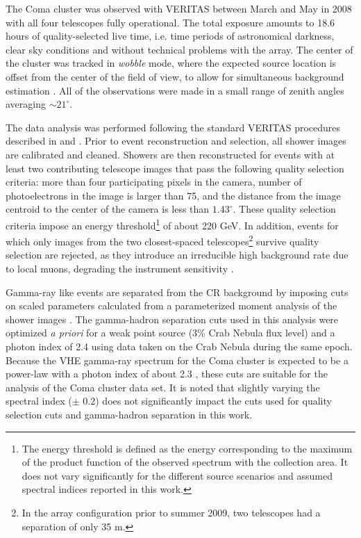 \documentclass[12pt,manuscript]{aastex}
\begin{document}
The Coma cluster was observed with VERITAS between March and May in 2008 with all four telescopes
fully operational. The total exposure amounts to 18.6 hours of quality-selected live time, i.e.
time periods of astronomical darkness, clear sky conditions and without technical problems with the
array. The center of the cluster was tracked in \emph{wobble} mode, where the expected source
location is offset from the center of the field of view, to allow for simultaneous background
estimation \citep{article:Fomin_etal:1994}. All of the observations were made in a small range of
zenith angles averaging $\sim 21^{\circ}$.

The data analysis was performed following the standard VERITAS procedures described in
\citet{inproc:Cogan_etal:2007} and \citet{inproc:Daniel_etal:2007}. Prior to event reconstruction
and selection, all shower images are calibrated and cleaned. Showers are then reconstructed for
events with at least two contributing telescope images that pass the following quality selection
criteria: more than four participating pixels in the camera, number of photoelectrons in the image
is larger than 75, and the distance from the image centroid to the center of the camera is less
than $1.43^{\circ}$. These quality selection criteria impose an energy threshold\footnote{The energy
threshold is defined as the energy corresponding to the maximum of the product function of the
observed spectrum with the collection area. It does not vary significantly for the different source
scenarios and assumed spectral indices reported in this work.} of about 220 GeV. In addition,
events for which only images from the two closest-spaced telescopes\footnote{In the array
configuration prior to summer 2009, two telescopes  had a separation of only 35 m.} survive quality
selection are rejected, as they introduce an irreducible high background rate due to local muons, 
degrading the instrument sensitivity \citep{article:MaierKnapp:2007}.

Gamma-ray like events are separated from the CR background by imposing cuts on scaled parameters
\citep{article:Aharonian_etal:1997, article:Krawczynski_etal:2006} calculated from a parameterized
moment analysis of the shower images \citep{inproc:Hillas:1985}. The gamma-hadron separation cuts
used in this analysis were optimized {\em a priori} for a weak point source (3\% Crab Nebula flux
level) and a photon index of 2.4 using data taken on the Crab Nebula during the same epoch. Because
the VHE gamma-ray spectrum for the Coma cluster is expected to be a power-law with a photon index of
about 2.3 \citep{article:PinzkePfrommer:2010}, these cuts are suitable for the analysis of the Coma
cluster data set. It is noted that slightly varying the spectral index ($\pm$ 0.2) does not
significantly impact the cuts used for quality selection cuts and gamma-hadron separation in this
work. 
\end{document}
